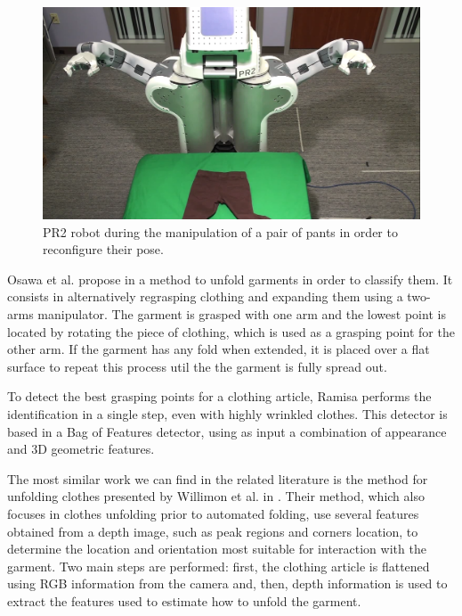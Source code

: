 \begin{figure}[thpb]
    \centering
    \includegraphics[width=\textwidth]{figures/SOTA_Cusumano_PR2.png}
    \caption[PR2 robot during the manipulation of a pair of pants in order to reconfigure their pose.]
    {PR2 robot during the manipulation of a pair of pants in order to reconfigure their pose. }
    \label{fig:SOTA_Cusumano_2011}
\end{figure}

Osawa et al. propose in \cite{Osawa2006} a method to unfold garments in order to classify them. It consists in alternatively regrasping clothing and expanding them using a two-arms manipulator. The garment is grasped with one arm and the lowest point is located by rotating the piece of clothing, which is used as a grasping point for the other arm. If the garment has any fold when extended, it is placed over a flat surface to repeat this process util the the garment is fully spread out.

To detect the best grasping points for a clothing article, Ramisa \cite{Ramisa2012} performs the identification in a single step, even with highly wrinkled clothes. This detector is based in a Bag of Features detector, using as input a combination of appearance and 3D geometric features.

The most similar work we can find in the related literature is the method for unfolding clothes presented by Willimon et al. in \cite{Willimon2011}. Their method, which also focuses in clothes unfolding prior to automated folding, use several features obtained from a depth image, such as peak regions and corners location, to determine the location and orientation most suitable for interaction with the garment. Two main steps are performed: first, the clothing article is flattened using RGB information from the camera and, then, depth information is used to extract the features used to estimate how to unfold the garment.

